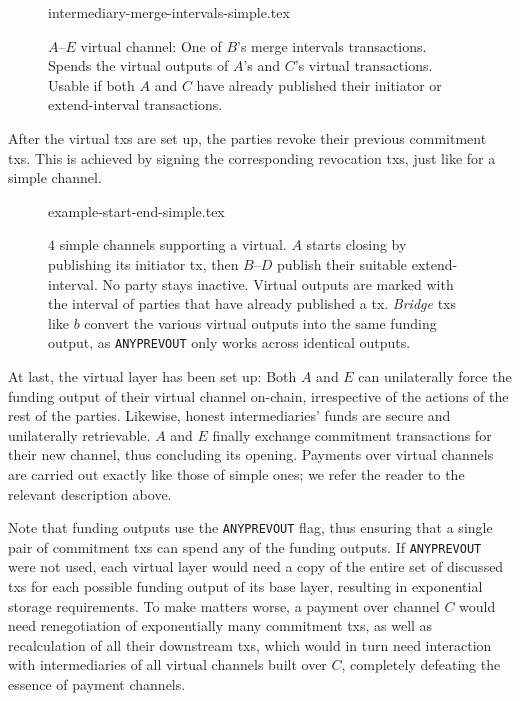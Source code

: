   \addtolength{\intextsep}{-15pt}
  \begin{figure}[!htbp]
    {intermediary-merge-intervals-simple.tex}
    \caption{$A$--$E$ virtual channel: One of $B$'s merge intervals
    transactions. Spends the virtual outputs of $A$'s and $C$'s virtual
    transactions. Usable if both $A$ and $C$ have already published their
    initiator or extend-interval transactions.}
    \label{figure:virtual-layer-merge-intervals-simple}
  \end{figure}
  \addtolength{\intextsep}{15pt}

  After the virtual txs are set up, the parties revoke their previous commitment
  txs. This is achieved by signing the corresponding revocation txs, just like
  for a simple channel.

  \addtolength{\intextsep}{-15pt}
  \begin{figure}
    \centering
    {example-start-end-simple.tex}
    \caption{$4$ simple channels supporting a virtual. $A$ starts closing by
    publishing its initiator tx, then $B$--$D$ publish their
    suitable extend-interval. No party stays inactive.
    Virtual outputs are marked with the interval of parties that have
    already published a tx. \emph{Bridge} txs
    like $b$ convert the various virtual outputs into the
    same funding output, as \texttt{ANYPREVOUT} only works across identical
    outputs.}
    \label{figure:example-start-end-simple}
  \end{figure}
  \addtolength{\intextsep}{15pt}

  At last, the virtual layer has been set up: Both $A$ and $E$ can unilaterally
  force the funding output of their virtual channel on-chain, irrespective of
  the actions of the rest of the parties. Likewise, honest intermediaries' funds
  are secure and unilaterally retrievable. $A$ and $E$ finally exchange
  commitment transactions for their new channel, thus concluding its opening.
  Payments over virtual channels are carried out exactly like those of simple
  ones; we refer the reader to the relevant description above.

  Note that funding outputs use the \texttt{ANYPREVOUT} flag, thus ensuring
  that a single pair of commitment txs can spend any of the funding outputs. If
  \texttt{ANYPREVOUT} were not used, each virtual layer would need a copy of the
  entire set of discussed txs for each possible funding output of its base
  layer, resulting in exponential storage requirements. To make matters worse,
  a payment over channel $C$ would need renegotiation of exponentially many
  commitment txs, as well as recalculation of all their downstream txs, which
  would in turn need interaction with intermediaries of all virtual channels
  built over $C$, completely defeating the essence of payment channels.

